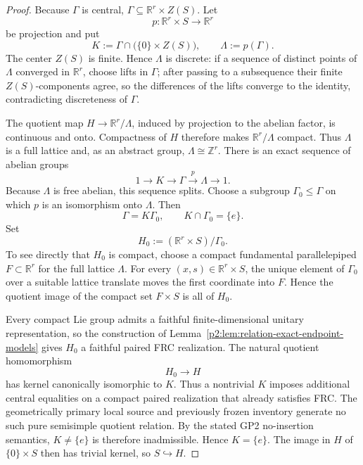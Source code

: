 \documentclass[12pt,a4paper]{article}
\begin{document}
\begin{proof}
Because \(\Gamma\) is central,
\(\Gamma\subseteq\mathbb R^r\times Z(S)\).  Let
\[
 p:\mathbb R^r\times S\longrightarrow\mathbb R^r
\]
be projection and put
\[
 K:=\Gamma\cap\bigl(\{0\}\times Z(S)\bigr),
 \qquad \Lambda:=p(\Gamma).
\]
The center \(Z(S)\) is finite.  Hence \(\Lambda\) is discrete: if a sequence
of distinct points of \(\Lambda\) converged in \(\mathbb R^r\), choose lifts
in \(\Gamma\); after passing to a subsequence their finite \(Z(S)\)-components
agree, so the differences of the lifts converge to the identity, contradicting
discreteness of \(\Gamma\).

The quotient map \(H\to\mathbb R^r/\Lambda\), induced by projection to the
abelian factor, is continuous and onto.  Compactness of \(H\) therefore makes
\(\mathbb R^r/\Lambda\) compact.  Thus \(\Lambda\) is a full lattice and, as
an abstract group, \(\Lambda\cong\mathbb Z^r\).  There is an exact sequence
of abelian groups
\[
 1\longrightarrow K\longrightarrow\Gamma
   \xrightarrow{\ p\ }\Lambda\longrightarrow1.
\]
Because \(\Lambda\) is free abelian, this sequence splits.  Choose a subgroup
\(\Gamma_0\le\Gamma\) on which \(p\) is an isomorphism onto \(\Lambda\).
Then
\[
 \Gamma=K\Gamma_0,
 \qquad K\cap\Gamma_0=\{e\}.
\]
Set
\[
 H_0:=(\mathbb R^r\times S)/\Gamma_0.
\]
To see directly that \(H_0\) is compact, choose a compact fundamental
parallelepiped \(F\subset\mathbb R^r\) for the full lattice \(\Lambda\).
For every \((x,s)\in\mathbb R^r\times S\), the unique element of
\(\Gamma_0\) over a suitable lattice translate moves the first coordinate
into \(F\).  Hence the quotient image of the compact set \(F\times S\) is all
of \(H_0\).

Every compact Lie group admits a faithful finite-dimensional unitary
representation, so the construction of
Lemma~\ref{p2:lem:relation-exact-endpoint-models} gives \(H_0\) a faithful
paired FRC realization.  The natural quotient homomorphism
\[
        H_0\longrightarrow H
\]
has kernel canonically isomorphic to \(K\).  Thus a nontrivial \(K\) imposes
additional central equalities on a compact paired realization that already
satisfies FRC.  The geometrically primary local source and previously frozen
inventory generate no such pure semisimple quotient relation.  By the stated
GP2 no-insertion semantics,
\(K\ne\{e\}\) is therefore inadmissible.  Hence \(K=\{e\}\).  The image in
\(H\) of \(\{0\}\times S\) then has trivial kernel, so \(S\hookrightarrow H\).
\end{proof}
\end{document}
